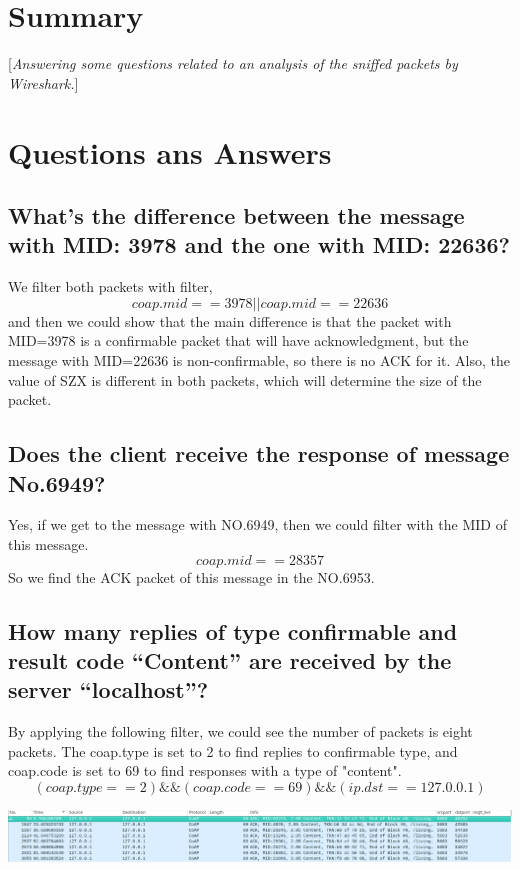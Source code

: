 \documentclass[10pt,english, openany]{book}
\begin{document}
\chapter{Summary}\label{chapt:sum}
[\textit{Answering some questions related to an analysis of the sniffed packets by Wireshark.}]
\newpage
\chapter{Questions ans Answers}
\section{What’s the difference between the message with MID:
3978 and the one with MID: 22636?}
We filter both packets with filter, \begin{equation*} coap.mid == 3978 || coap.mid == 22636 \end{equation*} and then we could show that the main difference is that the packet with MID=3978 is a confirmable packet that will have acknowledgment, but the message with MID=22636 is non-confirmable, so there is no ACK for it. Also, the value of SZX is different in both packets, which will determine the size of the packet.

\section{Does the client receive the response of message No.6949?}
Yes, if we get to the message with NO.6949, then we could filter with the MID of this message. \begin{equation*} coap.mid ==28357 \end{equation*} So we find the ACK packet of this message in the NO.6953. 

\section{How many replies of type confirmable and result code “Content” are received by the server “localhost”?}
By applying the following filter, we could see the number of packets is eight packets. The coap.type is set to 2  to find replies to confirmable type, and coap.code is set to 69 to find responses with a type of "content".
\begin{equation*}(coap.type == 2)\&\&(coap.code==69)\&\&(ip.dst == 127.0.0.1)\end{equation*}

\includegraphics[scale=0.27]{3.png}
\end{document}
